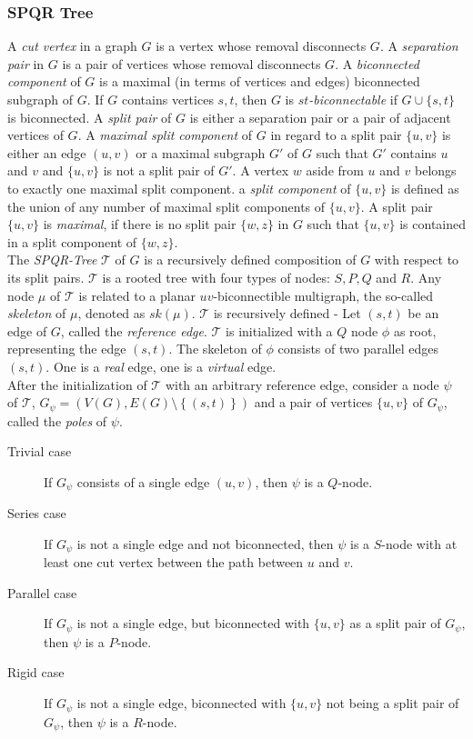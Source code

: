 \subsubsection{SPQR Tree}
A \emph{cut vertex} in a graph $G$ is a vertex whose removal disconnects $G$. A \emph{separation pair} in $G$ is a pair of vertices whose removal disconnects $G$. A \emph{biconnected component} of $G$ is a maximal (in terms of vertices and edges) biconnected subgraph of $G$. If $G$ contains vertices $s,t$, then $G$ is \emph{$st$-biconnectable} if $G \cup \{s,t\}$ is biconnected. A \emph{split pair} of $G$ is either a separation pair or a pair of adjacent vertices of $G$. A \emph{maximal split component} of $G$ in regard to a split pair $\{u,v\}$ is either an edge $(u,v)$ or a maximal subgraph $G'$ of $G$ such that $G'$ contains $u$ and $v$ and $\{u,v\}$ is not a split pair of $G'$. A vertex $w$ aside from $u$ and $v$ belongs to exactly one maximal split component. a \emph{split component} of $\{u,v\}$ is defined as the union of any number of maximal split components of $\{u,v\}$. A split pair $\{u,v\}$ is \emph{maximal}, if there is no split pair $\{w,z\}$ in $G$ such that $\{u,v\}$ is contained in a split component of $\{w,z\}$.\\
The \emph{SPQR-Tree} $\mathcal{T}$ of $G$ is a recursively defined composition of $G$ with respect to its split pairs. $\mathcal{T}$ is a rooted tree with four types of nodes: $S,P,Q$ and $R$. Any node $\mu$ of $\mathcal{T}$ is related to a planar $uv$-biconnectible multigraph, the so-called \emph{skeleton} of $\mu$, denoted as $sk(\mu)$. $\mathcal{T}$ is recursively defined - Let $(s,t)$ be an edge of $G$, called the \emph{reference edge}. $\mathcal{T}$ is initialized with a $Q$ node $\phi$ as root, representing the edge $(s,t)$. The skeleton of $\phi$ consists of two parallel edges $(s,t)$. One is a \emph{real }edge, one is a \emph{virtual }edge.\\
After the initialization of $\mathcal{T}$ with an arbitrary reference edge, consider a node $\psi$ of $\mathcal{T}$, $G_\psi=\left(V(G),E(G)\setminus\left\{(s,t)\right\}\right)$ and a pair of vertices $\{u,v\}$ of $G_\psi$, called the \emph{poles} of $\psi$.

\begin{description}
	\item[Trivial case] If $G_\psi$ consists of a single edge $(u,v)$, then $\psi$ is a $Q$-node.
	\item[Series case] If $G_\psi$ is not a single edge and not biconnected, then $\psi$ is a $S$-node with at least one cut vertex between the path between $u$ and $v$.
	\item[Parallel case] If $G_\psi$ is not a single edge, but biconnected with $\{u,v\}$ as a split pair of $G_\psi$, then $\psi$ is a $P$-node.
	\item[Rigid case] If $G_\psi$ is not a single edge, biconnected with $\{u,v\}$ not being a split pair of $G_\psi$, then $\psi$ is a $R$-node.
\end{description}
\cite[P. 7-8]{SPQR-Tree}
